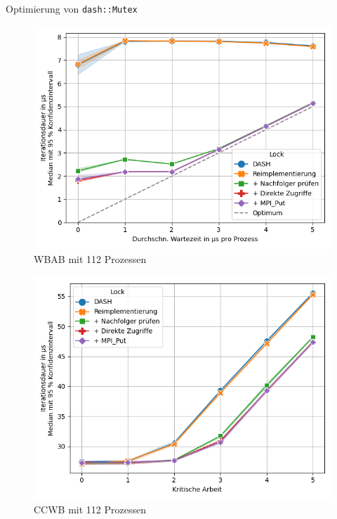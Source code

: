 \documentclass[fleqn,compress,utf8,aspectratio=169,t]{beamer}
\begin{document}
\begin{frame}{Optimierung von \texttt{dash::Mutex}}
    \begin{minipage}{.49\textwidth}
        \begin{figure}
            \includegraphics[width=\textwidth]{../../Dokumentation/Latex/Bilder/benchmarks/intelmpi/dash-optimization/WBAB-processes=112,mpi_progress=1-latency}
            \caption{WBAB mit 112 Prozessen}
        \end{figure}
    \end{minipage}
    \begin{minipage}{.49\textwidth}
        \begin{figure}
            \includegraphics[width=\textwidth]{../../Dokumentation/Latex/Bilder/benchmarks/intelmpi/dash-optimization/CCWB-processes=112-latency}
            \caption{CCWB mit 112 Prozessen}
        \end{figure}
    \end{minipage}
\end{frame}
\end{document}
